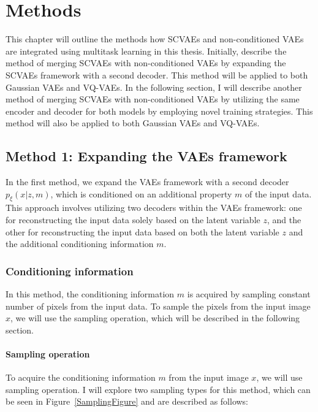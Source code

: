 \chapter{Methods}

This chapter will outline the methods how SCVAEs and non-conditioned VAEs are integrated using multitask learning in this thesis. Initially, describe the method of merging SCVAEs with non-conditioned VAEs by expanding the SCVAEs framework with a second decoder. This method will be applied to both Gaussian VAEs and VQ-VAEs. In the following section, I will describe another method of merging SCVAEs with non-conditioned VAEs by utilizing the same encoder and decoder for both models by employing novel training strategies. This method will also be applied to both Gaussian VAEs and VQ-VAEs.

\section{Method 1: Expanding the VAEs framework}

In the first method, we expand the VAEs framework with a second decoder $p_\xi(x|z,m)$, which is conditioned on an additional property $m$ of the input data. This approach involves utilizing two decoders within the VAEs framework: one for reconstructing the input data solely based on the latent variable $z$, and the other for reconstructing the input data based on both the latent variable $z$ and the additional conditioning information $m$.

\subsection{Conditioning information}

In this method, the conditioning information $m$ is acquired by sampling constant number of pixels from the input data. To sample the pixels from the input image $x$, we will use the sampling operation, which will be described in the following section.

\subsubsection{Sampling operation}

To acquire the conditioning information $m$ from the input image $x$, we will use sampling operation. I will explore two sampling types for this method, which can be seen in Figure~\ref{SamplingFigure} and are described as follows: 

